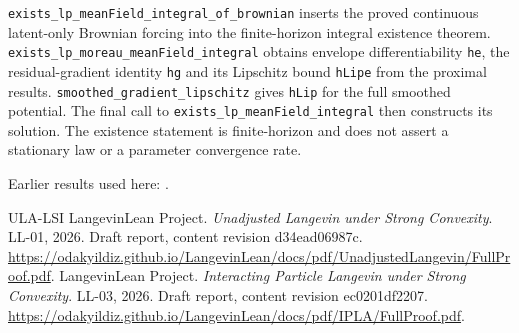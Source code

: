 \documentclass[11pt,a4paper]{article}
\begin{document}
\begin{leanbox}
\texttt{exists\_\allowbreak{}lp\_\allowbreak{}mean\allowbreak{}Field\_\allowbreak{}integral\_\allowbreak{}of\_\allowbreak{}brownian} inserts the proved continuous latent-only Brownian forcing into the finite-horizon integral existence theorem. \texttt{exists\_\allowbreak{}lp\_\allowbreak{}moreau\_\allowbreak{}mean\allowbreak{}Field\_\allowbreak{}integral} obtains envelope differentiability \texttt{he}, the residual-gradient identity \texttt{hg} and its Lipschitz bound \texttt{h\allowbreak{}Lipe} from the proximal results. \texttt{smoothed\_\allowbreak{}gradient\_\allowbreak{}lipschitz} gives \texttt{h\allowbreak{}Lip} for the full smoothed potential. The final call to \texttt{exists\_\allowbreak{}lp\_\allowbreak{}mean\allowbreak{}Field\_\allowbreak{}integral} then constructs its solution. The existence statement is finite-horizon and does not assert a stationary law or a parameter convergence rate.
\end{leanbox}


Earlier results used here: \cite[Section~3.1.1]{LangevinLean2026IPLA}.

\begin{thebibliography}{ULA-LSI}
LangevinLean Project. \emph{Unadjusted Langevin under Strong Convexity}. LL-01, 2026. Draft report, content revision d34ead06987c. \url{https://odakyildiz.github.io/LangevinLean/docs/pdf/UnadjustedLangevin/FullProof.pdf}.
LangevinLean Project. \emph{Interacting Particle Langevin under Strong Convexity}. LL-03, 2026. Draft report, content revision ec0201df2207. \url{https://odakyildiz.github.io/LangevinLean/docs/pdf/IPLA/FullProof.pdf}.
\end{thebibliography}
\end{document}
